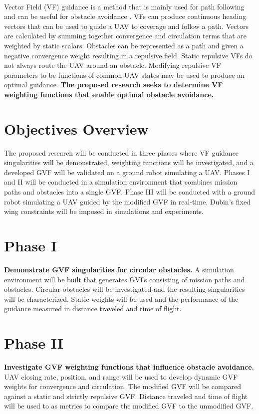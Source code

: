 \documentclass[numbered,pdftex]{ohio-etd}
\begin{document}
\\
Vector Field (VF) guidance is a method that is mainly used for path following and can be useful for obstacle avoidance \cite{wwc,panagou_motion_2014}. VFs can produce continuous heading vectors that can be used to guide a UAV to coverage and follow a path. Vectors are calculated by summing together convergence and circulation terms that are weighted by static scalars. Obstacles can be represented as a path and given a negative convergence weight resulting in a repulsive field. Static repulsive VFs do not always route the UAV around an obstacle. Modifying repulsive VF parameters to be functions of common UAV states may be used to produce an optimal guidance. \textbf{The proposed research seeks to determine VF weighting functions that enable optimal obstacle avoidance.}



 \pagebreak
 
 \section{Objectives Overview}
 The proposed research will be conducted in three phases where VF guidance  singularities will be demonstrated, weighting functions will be investigated, and a developed GVF will be validated on a ground robot simulating a UAV.  Phases I and II will be conducted in a simulation environment that combines mission paths and obstacles into a single GVF. Phase III will be conducted with a ground robot simulating a UAV guided by the modified GVF in real-time. Dubin's fixed wing constraints will be imposed in simulations and experiments. 
 
 
 \section{Phase I}
 \textbf{Demonstrate GVF singularities for circular obstacles.} A simulation environment will be built that generates GVFs consisting of mission paths and obstacles. Circular obstacles will be investigated and the resulting singularities will be characterized. Static weights will be used and the performance of the guidance measured in distance traveled and time of flight. 
 
 
 
 \section{Phase II}
 \textbf{Investigate GVF weighting functions that influence obstacle avoidance.} UAV closing rate, position, and range will be used to develop dynamic GVF weights for convergence and circulation. The modified GVF will be compared against a static and strictly repulsive GVF. Distance traveled and time of flight will be used to as metrics to compare the modified GVF to the unmodified GVF.  
 
\end{document}
